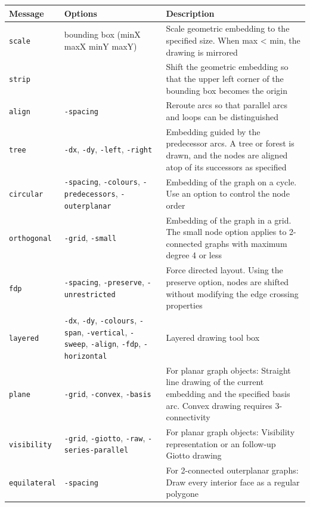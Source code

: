 \documentclass[a4paper,11pt,twoside]{book}
\begin{document}
\bigskip
\begin{center}
\begin{tabular}{|p{2.0cm}|p{8cm}|p{14.5cm}|}
\hline
{\bf Message}       & {\bf Options} & {\bf Description} \\
\hline
\hline
\verb/scale/        & bounding box (minX maxX minY maxY)
                    & Scale geometric embedding to the specified size. When
                      max < min, the drawing is mirrored \\
\hline
\verb/strip/        &
                    & Shift the geometric embedding so that the upper left corner
                      of the bounding box becomes the origin \\
\hline
\verb/align/        & \verb/-spacing/
                    & Reroute arcs so that parallel arcs and loops can be
                      distinguished \\
\hline
\verb/tree/         & \verb/-dx/, \verb/-dy/, \verb/-left/, \verb/-right/
                    & Embedding guided by the predecessor arcs. A tree or forest
                      is drawn, and the nodes are aligned atop of its successors
                      as specified \\
\hline
\verb/circular/     & \verb/-spacing/, \verb/-colours/, \verb/-predecessors/, \verb/-outerplanar/
                    & Embedding of the graph on a cycle. Use an option
                      to control the node order \\
\hline
\verb/orthogonal/   & \verb/-grid/, \verb/-small/
                    & Embedding of the graph in a grid. The small node option
                      applies to 2-connected graphs with maximum degree 4 or
                      less \\
\hline
\verb/fdp/          & \verb/-spacing/, \verb/-preserve/, \verb/-unrestricted/
                    & Force directed layout. Using the preserve option, nodes
                      are shifted without modifying the edge crossing properties \\
\hline
\verb/layered/      & \verb/-dx/, \verb/-dy/, \verb/-colours/, \verb/-span/, \verb/-vertical/,
                      \verb/-sweep/, \verb/-align/, \verb/-fdp/, \verb/-horizontal/
                    & Layered drawing tool box \\
\hline
\verb/plane/        & \verb/-grid/, \verb/-convex/, \verb/-basis/
                    & For planar graph objects: Straight line drawing of the
                      current embedding and the specified basis arc. Convex
                      drawing requires 3-connectivity \\
\hline
\verb/visibility/   & \verb/-grid/, \verb/-giotto/, \verb/-raw/, \verb/-series-parallel/
                    & For planar graph objects: Visibility representation or
                      an follow-up Giotto drawing \\
\hline
\verb/equilateral/  & \verb/-spacing/
                    & For 2-connected outerplanar graphs: Draw every interior
                      face as a regular polygone \\
\hline
\end{tabular}
\end{center}
\end{document}
